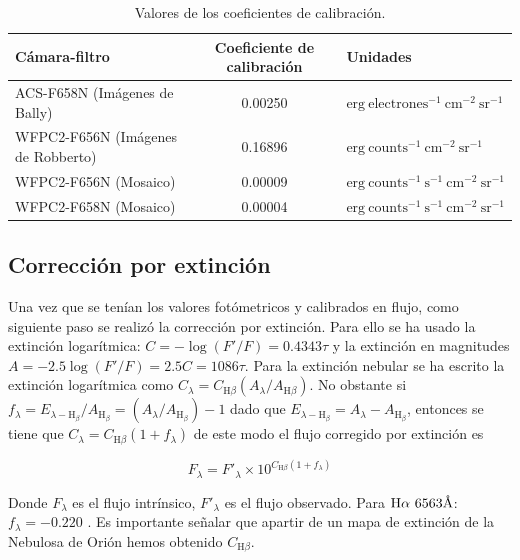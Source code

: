 \begin{table}[htp]
\centering
\small\raggedright
\renewcommand{\arraystretch}{1.5}
\caption{Valores de los coeficientes de calibración.}
  \label{tab:table-constans}

\begin{tabular}{ |l| |c| |l| }
\hline
Cámara-filtro&                       Coeficiente de calibración&       Unidades\\ \hline 
ACS-F658N (Imágenes de Bally)&       0.00250 &                          \(\mathrm{erg~electrones^{-1}~cm^{-2}~sr^{-1}}\)\\
WFPC2-F656N (Imágenes de Robberto)&  0.16896 &                          \(\mathrm{erg~counts^{-1}~cm^{-2}~sr^{-1}}\)\\
WFPC2-F656N (Mosaico)&               0.00009 &                          \(\mathrm{erg~counts^{-1}~s^{-1}~cm^{-2}~sr^{-1}}\)\\
WFPC2-F658N (Mosaico)&               0.00004 &                          \(\mathrm{erg~counts^{-1}~s^{-1}~cm^{-2}~sr^{-1}}\)\\ 
\hline
 \end{tabular} 
 \end{table}
\normalsize

\subsection{Corrección por extinción}
\label{sec:extintion}

Una vez que se tenían los valores fotómetricos y calibrados en flujo, como siguiente paso se  realizó la corrección por extinción. Para ello se ha usado la extinción logarítmica: \(C = -\log(F'/F) = 0.4343\tau\) y  la extinción en magnitudes \(A=-2.5\log(F'/F)=2.5C=1086\tau\). Para la extinción nebular se ha escrito la extinción logarítmica como  \(C_{\lambda} = C_{\text{H}\beta}(A_{\lambda}/A_{\text{H}\beta})\). No obstante si  \(f_{\lambda}= E_{\lambda-\text{H}_{\beta}}/A_{\text{H}_{\beta}}=(A_{\lambda}/A_{\text{H}_{\beta}})-1\)  dado que \(E_{\lambda-\text{H}_{\beta}}=A_{\lambda}-A_{\text{H}_{\beta}}\), entonces se tiene que \(C_{\lambda}= C_{\text{H}\beta}(1+f_{\lambda})\)  de este modo  el flujo corregido por extinción es

\begin{equation}
  \label{eq:flujo}
  F_{\lambda} = F'_{\lambda}\times10^{C_{\text{H}\beta}(1+f_{\lambda})}
\end{equation}

 Donde  \(F_{\lambda}\) es el flujo intrínsico, \(F'_{\lambda}\) es el flujo observado. Para \(\ha\ 6563\text{\AA{}}\): \(f_{\lambda} = -0.220\) \citep{Blagrave:2007}. Es importante señalar que  apartir de un mapa de extinción de la Nebulosa de Orión hemos obtenido \(C_{\text{H}\beta}\).

